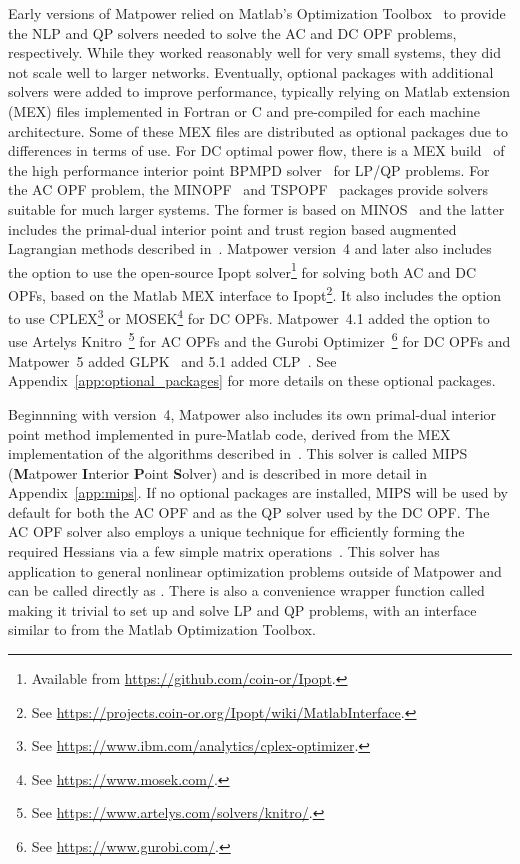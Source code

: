 \documentclass[12pt]{article}
\newcommand{\matlab}[0]{{\sc Matlab}}
\newcommand{\matpower}[0]{{\sc Matpower}}
\newcommand{\mips}[0]{{MIPS}}
\newcommand{\mipsname}[0]{{{\bf M}{\sc atpower} \textbf{I}nterior \textbf{P}oint \textbf{S}olver}}
\newcommand{\ipopt}[0]{{\sc Ipopt}}
\newcommand{\knitro}[0]{{Artelys Knitro}}
\newcommand{\clp}[0]{{CLP}}
\newcommand{\cplex}[0]{{CPLEX}}
\newcommand{\glpk}[0]{{GLPK}}
\newcommand{\gurobi}[0]{{Gurobi}}
\newcommand{\mosek}[0]{{MOSEK}}
\newcommand{\ot}[0]{{Optimization Toolbox}}
\newcommand{\code}[1]{{\relsize{-0.5}{\tt{{#1}}}}}  %
\numberwithin{equation}{section}
\numberwithin{table}{section}
\numberwithin{figure}{section}
\begin{document}
Early versions of \matpower{} relied on \matlab{}'s \ot{}~\cite{ot} to provide the NLP and QP solvers needed to solve the AC and DC OPF problems, respectively. While they worked reasonably well for very small systems, they did not scale well to larger networks. Eventually, optional packages with additional solvers were added to improve performance, typically relying on \matlab{} extension (MEX) files implemented in Fortran or C and pre-compiled for each machine architecture. Some of these MEX files are distributed as optional packages due to differences in terms of use. For DC optimal power flow, there is a MEX build~\cite{bpmpdmex} of the high performance interior point BPMPD solver~\cite{meszaros1996} for LP/QP problems. For the AC OPF problem, the MINOPF~\cite{minopf} and TSPOPF~\cite{tspopf} packages provide solvers suitable for much larger systems. The former is based on MINOS~\cite{murtagh} and the latter includes the primal-dual interior point and trust region based augmented Lagrangian methods described in~\cite{wang2007a}. \matpower{} version~4 and later also includes the option to use the open-source \ipopt{} solver\footnote{Available from \url{https://github.com/coin-or/Ipopt}.} for solving both AC and DC OPFs, based on the \matlab{} MEX interface to \ipopt{}\footnote{See \url{https://projects.coin-or.org/Ipopt/wiki/MatlabInterface}.}. It also includes the option to use \cplex{}\footnote{See \url{https://www.ibm.com/analytics/cplex-optimizer}.} or \mosek{}\footnote{See \url{https://www.mosek.com/}.} for DC OPFs. \matpower{}~4.1 added the option to use \knitro{}~\cite{knitro}\footnote{See \url{https://www.artelys.com/solvers/knitro/}.} for AC OPFs and the \gurobi{} Optimizer~\cite{gurobi}\footnote{See \url{https://www.gurobi.com/}.} for DC OPFs and \matpower{}~5 added \glpk{}~\cite{glpk} and 5.1 added \clp{}~\cite{clp}. See Appendix~\ref{app:optional_packages} for more details on these optional packages.

Beginnning with version~4, \matpower{} also includes its own primal-dual interior point method implemented in pure-\matlab{} code, derived from the MEX implementation of the algorithms described in~\cite{wang2007a}. This solver is called \mips{} (\mipsname{}) and is described in more detail in Appendix~\ref{app:mips}. If no optional packages are installed, \mips{} will be used by default for both the AC OPF and as the QP solver used by the DC OPF. The AC OPF solver also employs a unique technique for efficiently forming the required Hessians via a few simple matrix operations~\cite{zimmerman2010b, sereeter2018a, sereeter2018b}. This solver has application to general nonlinear optimization problems outside of \matpower{} and can be called directly as \code{mips}. There is also a convenience wrapper function called \code{qps\_mips} making it trivial to set up and solve LP and QP problems, with an interface similar to \code{quadprog} from the \matlab{} \ot{}.
\end{document}
